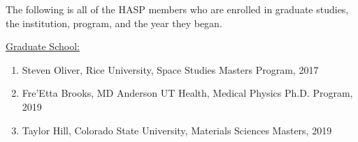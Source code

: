\begin{appendices}
  \vspace{0.5cm}
  
  \noindent The following is all of the HASP members who are enrolled in graduate studies, the institution, program, and the year they began.
  
  \vspace{0.25cm}
  \noindent\underline{Graduate School:}
  \begin{enumerate}[leftmargin=3\parindent]
  \item Steven Oliver, Rice University, Space Studies Masters Program, 2017
  \item Fre'Etta Brooks, MD Anderson UT Health, Medical Physics Ph.D. Program, 2019
  \item Taylor Hill, Colorado State University, Materials Sciences Masters, 2019
  \end{enumerate}

  
\end{appendices}
